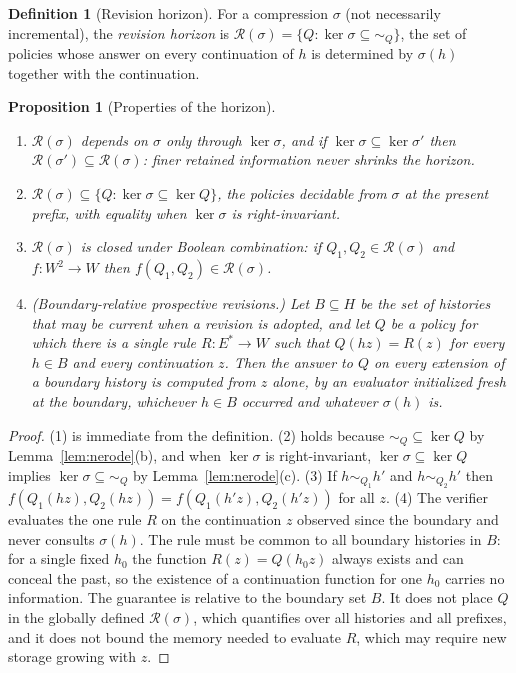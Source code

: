 \documentclass[11pt]{article}
\newtheorem{proposition}{Proposition}
\theoremstyle{definition}
\newtheorem{definition}{Definition}
\theoremstyle{remark}
\newcommand{\Ev}{E}
\newcommand{\Hist}{H}
\newcommand{\nerode}[1]{\sim_{#1}}
\newcommand{\Hor}{\mathcal{R}}
\begin{document}
\begin{definition}[Revision horizon]
For a compression $\sigma$ (not necessarily incremental), the \emph{revision horizon} is $\Hor(\sigma)=\{Q:\ker\sigma\subseteq\nerode{Q}\}$, the set of policies whose answer on every continuation of $h$ is determined by $\sigma(h)$ together with the continuation.
\end{definition}

\begin{proposition}[Properties of the horizon]\label{prop:horizon}
\begin{enumerate}
\item $\Hor(\sigma)$ depends on $\sigma$ only through $\ker\sigma$, and if $\ker\sigma\subseteq\ker\sigma'$ then $\Hor(\sigma')\subseteq\Hor(\sigma)$: finer retained information never shrinks the horizon.
\item $\Hor(\sigma)\subseteq\{Q:\ker\sigma\subseteq\ker Q\}$, the policies decidable from $\sigma$ at the present prefix, with equality when $\ker\sigma$ is right-invariant.
\item $\Hor(\sigma)$ is closed under Boolean combination: if $Q_1,Q_2\in\Hor(\sigma)$ and $f:W^2\to W$ then $f(Q_1,Q_2)\in\Hor(\sigma)$.
\item (Boundary-relative prospective revisions.) Let $B\subseteq\Hist$ be the set of histories that may be current when a revision is adopted, and let $Q$ be a policy for which there is a single rule $R:\Ev^{*}\to W$ such that $Q(hz)=R(z)$ for every $h\in B$ and every continuation $z$. Then the answer to $Q$ on every extension of a boundary history is computed from $z$ alone, by an evaluator initialized fresh at the boundary, whichever $h\in B$ occurred and whatever $\sigma(h)$ is.
\end{enumerate}
\end{proposition}

\begin{proof}
(1) is immediate from the definition. (2) holds because $\nerode{Q}\subseteq\ker Q$ by Lemma~\ref{lem:nerode}(b), and when $\ker\sigma$ is right-invariant, $\ker\sigma\subseteq\ker Q$ implies $\ker\sigma\subseteq\nerode{Q}$ by Lemma~\ref{lem:nerode}(c). (3) If $h\nerode{Q_1}h'$ and $h\nerode{Q_2}h'$ then $f(Q_1(hz),Q_2(hz))=f(Q_1(h'z),Q_2(h'z))$ for all $z$. (4) The verifier evaluates the one rule $R$ on the continuation $z$ observed since the boundary and never consults $\sigma(h)$. The rule must be common to all boundary histories in $B$: for a single fixed $h_0$ the function $R(z)=Q(h_0z)$ always exists and can conceal the past, so the existence of a continuation function for one $h_0$ carries no information. The guarantee is relative to the boundary set $B$. It does not place $Q$ in the globally defined $\Hor(\sigma)$, which quantifies over all histories and all prefixes, and it does not bound the memory needed to evaluate $R$, which may require new storage growing with $z$.
\end{proof}
\end{document}
